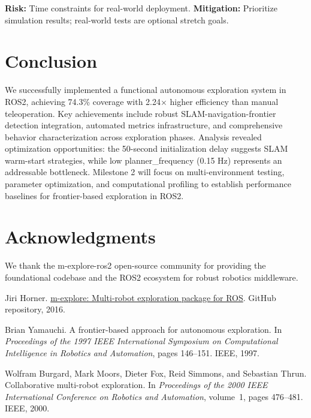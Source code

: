 \documentclass[conference]{IEEEtran}
\begin{document}
\textbf{Risk:} Time constraints for real-world deployment. \textbf{Mitigation:} Prioritize simulation results; real-world tests are optional stretch goals.

\section{Conclusion}

We successfully implemented a functional autonomous exploration system in ROS2, achieving 74.3\% coverage with 2.24$\times$ higher efficiency than manual teleoperation. Key achievements include robust SLAM-navigation-frontier detection integration, automated metrics infrastructure, and comprehensive behavior characterization across exploration phases. Analysis revealed optimization opportunities: the 50-second initialization delay suggests SLAM warm-start strategies, while low planner\_frequency (0.15 Hz) represents an addressable bottleneck. Milestone 2 will focus on multi-environment testing, parameter optimization, and computational profiling to establish performance baselines for frontier-based exploration in ROS2.

\section*{Acknowledgments}

We thank the m-explore-ros2 open-source community for providing the foundational codebase and the ROS2 ecosystem for robust robotics middleware.


\begin{thebibliography}{1}

Jiri Horner.
\newblock \href{https://github.com/hrnr/m-explore}{m-explore: Multi-robot exploration package for ROS}.
\newblock GitHub repository, 2016.

Brian Yamauchi.
\newblock A frontier-based approach for autonomous exploration.
\newblock In \emph{Proceedings of the 1997 IEEE International Symposium on Computational Intelligence in Robotics and Automation}, pages 146--151. IEEE, 1997.

Wolfram Burgard, Mark Moors, Dieter Fox, Reid Simmons, and Sebastian Thrun.
\newblock Collaborative multi-robot exploration.
\newblock In \emph{Proceedings of the 2000 IEEE International Conference on Robotics and Automation}, volume~1, pages 476--481. IEEE, 2000.

\end{thebibliography}
\end{document}
